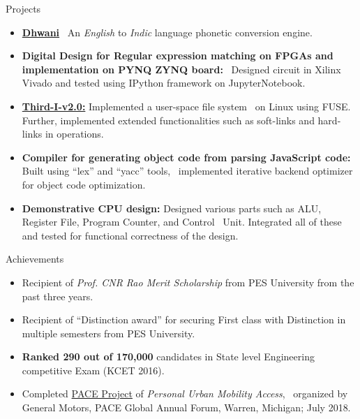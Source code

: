 \documentclass{CV} %
\begin{document}
\begin{rSection}{Projects}

  \begin{itemize}

  \item \textbf{\href{https://ndyashas.github.io/projects/Dhwani.html}{Dhwani}} \
    An \textit{English} to \textit{Indic} language phonetic conversion engine. 
    
  \item \textbf{Digital Design for Regular expression matching on FPGAs and implementation on PYNQ ZYNQ board:} \
    Designed circuit in Xilinx Vivado and tested using IPython framework on JupyterNotebook.

  \item \textbf{\href{https://github.com/ndyashas/Third-I-v2.0}{Third-I-v2.0:}} Implemented a user-space file system \
    on Linux using FUSE. Further, implemented extended functionalities such as soft-links and hard-links in operations.

  \item \textbf{Compiler for generating object code from parsing JavaScript code:} Built using ``lex'' and ``yacc'' tools, \
    implemented iterative backend optimizer for object code optimization.

  \item \textbf{Demonstrative CPU design:} Designed various parts such as ALU, Register File, Program Counter, and Control \
    Unit. Integrated all of these and tested for functional correctness of the design.
    
  \end{itemize}
  
\end{rSection}



\begin{rSection}{Achievements}

  \begin{itemize}

  \item Recipient of \textit{Prof. CNR Rao Merit Scholarship} from PES University from the past three years.

  \item Recipient of ``Distinction award'' for securing First class with Distinction in multiple semesters from PES University.
    
  \item \textbf{Ranked 290 out of 170,000} candidates in State level Engineering competitive Exam (KCET 2016).

  \item Completed \href{https://youtu.be/khK5RrpkqZM}{PACE Project} of \textit{Personal Urban Mobility Access}, \
    organized by General Motors, PACE Global Annual Forum, Warren, Michigan; July 2018.
    
  \end{itemize}
  
\end{rSection}
\end{document}
